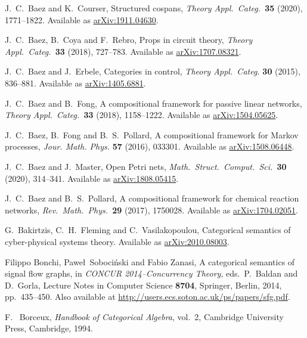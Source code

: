 \documentclass[reqno]{amsart}
\theoremstyle{definition}
\theoremstyle{remark}
\begin{document}
\begin{thebibliography}{100}

 J.\ C.\ Baez and K.\ Courser, Structured cospans,  \textsl{Theory Appl.\ Categ.\ }\textbf{35} (2020), 1771--1822.   Available as \href{http://arxiv.org/abs/1911.04630}{arXiv:1911.04630}.

 J.\ C.\ Baez, B.\ Coya and F.\ Rebro, Props in circuit theory, \textsl{Theory Appl.\ Categ.\ }\textbf{33} (2018), 727--783.    Available as \href{https://arxiv.org/abs/1707.08321}{arXiv:1707.08321}. 

 J.\ C.\ Baez and J.\ Erbele, Categories in control, \textsl{Theory Appl.\ Categ.} {\bf 30} (2015), 836--881. Available as \href{http://arxiv.org/abs/1405.6881}{arXiv:1405.6881}.

  J.\ C.\ Baez and B.\ Fong, A compositional framework for passive linear networks, \textsl{Theory Appl.\ Categ.\ }\textbf{33} (2018), 1158--1222.  Available as \href{http://arxiv.org/abs/1504.05625}{arXiv:1504.05625}.

 J.\ C.\ Baez, B.\ Fong and B.\ S.\ Pollard, A compositional framework for Markov processes, \textsl{Jour. Math. Phys.} \textbf{57} (2016), 033301. Available as \href{http://arxiv.org/abs/1508.06448}{arXiv:1508.06448}.

  J.\ C.\ Baez and J.\ Master, Open Petri nets, \textsl{Math.\ Struct.\ Comput.\ Sci.\ }\textbf{30} (2020), 314--341. Available as 
\href{https://arxiv.org/abs/1808.05415}{arXiv:1808.05415}. 

 J.\ C.\ Baez and B.\ S.\ Pollard, A compositional framework for chemical reaction networks, \textsl{Rev.\ Math.\ Phys.\ }\textbf{29} (2017), 1750028.  Available as \href{http://arxiv.org/abs/1704.02051}{arXiv:1704.02051}.

 G.\ Bakirtzis, C.\ H.\ Fleming and C.\ Vasilakopoulou, Categorical semantics of cyber-physical systems theory. Available as 
\href{https://arxiv.org/abs/2010.08003}{arXiv:2010.08003}.

 Filippo Bonchi, Pawe\l~Soboci\'nski and Fabio Zanasi, A categorical semantics of signal flow graphs, in \textsl{CONCUR 2014--Concurrency Theory}, eds.\ P.\ Baldan and D.\ Gorla, Lecture Notes in Computer Science \textbf{8704}, Springer, Berlin, 2014, pp.\ 435--450.  Also available at \href{http://users.ecs.soton.ac.uk/ps/papers/sfg.pdf}{http://users.ecs.soton.ac.uk/ps/papers/sfg.pdf}.

 F. \ Borceux, \textsl{Handbook of Categorical Algebra}, vol.\ 2, 
Cambridge University Press, Cambridge, 1994.


\end{thebibliography}
\end{document}
